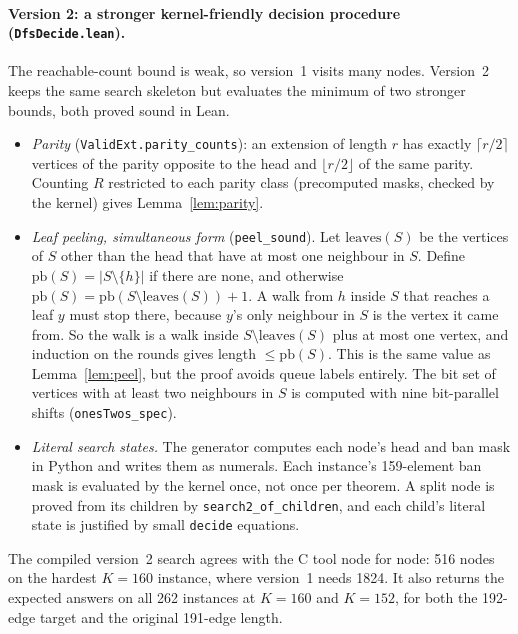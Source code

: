 \documentclass[11pt,a4paper]{article}
\theoremstyle{definition}
\begin{document}
\paragraph{Version 2: a stronger kernel-friendly decision procedure (\texttt{DfsDecide.lean}).} The reachable-count bound is weak, so version~1 visits many nodes. Version~2 keeps the same search skeleton but evaluates the minimum of two stronger bounds, both proved sound in Lean.
\begin{itemize}[leftmargin=*]
\item \emph{Parity} (\texttt{ValidExt.parity\_counts}): an extension of length $r$ has exactly $\lceil r/2\rceil$ vertices of the parity opposite to the head and $\lfloor r/2\rfloor$ of the same parity. Counting $R$ restricted to each parity class (precomputed masks, checked by the kernel) gives Lemma~\ref{lem:parity}.
\item \emph{Leaf peeling, simultaneous form} (\texttt{peel\_sound}). Let $\mathrm{leaves}(S)$ be the vertices of $S$ other than the head that have at most one neighbour in $S$. Define $\mathrm{pb}(S)=|S\setminus\{h\}|$ if there are none, and otherwise $\mathrm{pb}(S)=\mathrm{pb}(S\setminus\mathrm{leaves}(S))+1$. A walk from $h$ inside $S$ that reaches a leaf $y$ must stop there, because $y$'s only neighbour in $S$ is the vertex it came from. So the walk is a walk inside $S\setminus\mathrm{leaves}(S)$ plus at most one vertex, and induction on the rounds gives length $\le\mathrm{pb}(S)$. This is the same value as Lemma~\ref{lem:peel}, but the proof avoids queue labels entirely. The bit set of vertices with at least two neighbours in $S$ is computed with nine bit-parallel shifts (\texttt{onesTwos\_spec}).
\item \emph{Literal search states.} The generator computes each node's head and ban mask in Python and writes them as numerals. Each instance's 159-element ban mask is evaluated by the kernel once, not once per theorem. A split node is proved from its children by \texttt{search2\_of\_children}, and each child's literal state is justified by small \texttt{decide} equations.
\end{itemize}
The compiled version~2 search agrees with the C tool node for node: 516 nodes on the hardest $K=160$ instance, where version~1 needs 1824. It also returns the expected answers on all 262 instances at $K=160$ and $K=152$, for both the 192-edge target and the original 191-edge length.
\end{document}
